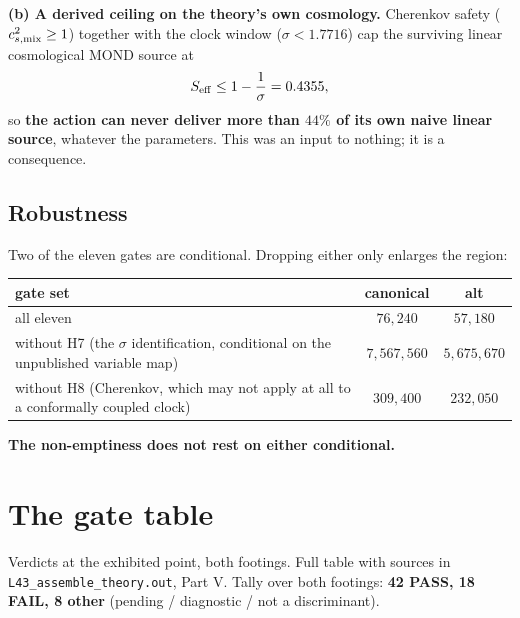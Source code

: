 \documentclass[11pt,letterpaper]{article}
\begin{document}
\textbf{(b) A derived ceiling on the theory's own cosmology.} Cherenkov safety ($c_{s,\rm mix}^2\ge1$) together with the clock window ($\sigma<1.7716$) cap the surviving linear cosmological MOND source at
\begin{equation}
S_{\rm eff}\le1-\frac1\sigma=0.4355,
\end{equation}
so \textbf{the action can never deliver more than $44\%$ of its own naive linear source}, whatever the parameters. This was an input to nothing; it is a consequence.

\subsection*{Robustness}
Two of the eleven gates are conditional. Dropping either only enlarges the region:

\begin{center}
\begin{tabular}{L{0.62\textwidth}cc}\toprule
gate set & canonical & alt\\\midrule
all eleven & $76{,}240$ & $57{,}180$\\
without H7 (the $\sigma$ identification, conditional on the unpublished variable map) & $7{,}567{,}560$ & $5{,}675{,}670$\\
without H8 (Cherenkov, which may not apply at all to a conformally coupled clock) & $309{,}400$ & $232{,}050$\\\bottomrule
\end{tabular}
\end{center}

\textbf{The non-emptiness does not rest on either conditional.}

\section{The gate table}\label{sec:gates}
Verdicts at the exhibited point, both footings. Full table with sources in \texttt{L43\_assemble\_theory.out}, Part V. Tally over both footings: \textbf{42 PASS, 18 FAIL, 8 other} (pending / diagnostic / not a discriminant).
\end{document}
